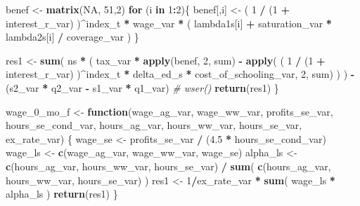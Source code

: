 \documentclass[]{article}
\newenvironment{Shaded}{\begin{snugshade}}{\end{snugshade}}
\newcommand{\CommentTok}[1]{\textcolor[rgb]{0.56,0.35,0.01}{\textit{#1}}}
\newcommand{\ControlFlowTok}[1]{\textcolor[rgb]{0.13,0.29,0.53}{\textbf{#1}}}
\newcommand{\DecValTok}[1]{\textcolor[rgb]{0.00,0.00,0.81}{#1}}
\newcommand{\FloatTok}[1]{\textcolor[rgb]{0.00,0.00,0.81}{#1}}
\newcommand{\KeywordTok}[1]{\textcolor[rgb]{0.13,0.29,0.53}{\textbf{#1}}}
\newcommand{\NormalTok}[1]{#1}
\newcommand{\OperatorTok}[1]{\textcolor[rgb]{0.81,0.36,0.00}{\textbf{#1}}}
\newcommand{\OtherTok}[1]{\textcolor[rgb]{0.56,0.35,0.01}{#1}}
\newcommand{\StringTok}[1]{\textcolor[rgb]{0.31,0.60,0.02}{#1}}
\begin{document}
\begin{Shaded}
\begin{Highlighting}[]
{\NormalTok{  benef <-}\StringTok{ }\KeywordTok{matrix}\NormalTok{(}\OtherTok{NA}\NormalTok{, }\DecValTok{51}\NormalTok{,}\DecValTok{2}\NormalTok{)}
  \ControlFlowTok{for}\NormalTok{ (i }\ControlFlowTok{in} \DecValTok{1}\OperatorTok{:}\DecValTok{2}\NormalTok{)\{}
\NormalTok{  benef[,i] <-}\StringTok{ }\NormalTok{( }\DecValTok{1} \OperatorTok{/}\StringTok{ }\NormalTok{(}\DecValTok{1} \OperatorTok{+}\StringTok{ }\NormalTok{interest_r_var) )}\OperatorTok{^}\NormalTok{index_t }\OperatorTok{*}\StringTok{ }\NormalTok{wage_var }\OperatorTok{*}
\StringTok{                     }\NormalTok{( lambda1s[i] }\OperatorTok{+}\StringTok{ }\NormalTok{saturation_var }\OperatorTok{*}\StringTok{ }\NormalTok{lambda2s[i] }\OperatorTok{/}\StringTok{ }\NormalTok{coverage_var )}
\NormalTok{  \}}

\NormalTok{  res1 <-}\StringTok{ }\KeywordTok{sum}\NormalTok{( ns }\OperatorTok{*}\StringTok{ }\NormalTok{( tax_var }\OperatorTok{*}\StringTok{ }\KeywordTok{apply}\NormalTok{(benef, }\DecValTok{2}\NormalTok{, sum) }\OperatorTok{-}
\StringTok{            }\KeywordTok{apply}\NormalTok{( ( }\DecValTok{1} \OperatorTok{/}\StringTok{ }\NormalTok{(}\DecValTok{1} \OperatorTok{+}\StringTok{ }\NormalTok{interest_r_var) )}\OperatorTok{^}\NormalTok{index_t }\OperatorTok{*}
\StringTok{                     }\NormalTok{delta_ed_s }\OperatorTok{*}\StringTok{ }\NormalTok{cost_of_schooling_var, }\DecValTok{2}\NormalTok{, sum) )}
\NormalTok{          ) }\OperatorTok{-}\StringTok{ }\NormalTok{(s2_var }\OperatorTok{*}\StringTok{ }\NormalTok{q2_var  }\OperatorTok{-}\StringTok{ }\NormalTok{s1_var }\OperatorTok{*}\StringTok{ }\NormalTok{q1_var)}
\CommentTok{#  wser()}
  \KeywordTok{return}\NormalTok{(res1)   }
\NormalTok{\}}

\NormalTok{wage_}\DecValTok{0}\NormalTok{_mo_f <-}\StringTok{ }\ControlFlowTok{function}\NormalTok{(wage_ag_var, wage_ww_var, profits_se_var, hours_se_cond_var, }
\NormalTok{                        hours_ag_var, hours_ww_var, hours_se_var, ex_rate_var) \{}
\NormalTok{  wage_se <-}\StringTok{ }\NormalTok{profits_se_var }\OperatorTok{/}\StringTok{ }\NormalTok{(}\FloatTok{4.5} \OperatorTok{*}\StringTok{ }\NormalTok{hours_se_cond_var)}
\NormalTok{  wage_ls <-}\StringTok{ }\KeywordTok{c}\NormalTok{(wage_ag_var, wage_ww_var, wage_se)}
\NormalTok{  alpha_ls <-}\StringTok{ }\KeywordTok{c}\NormalTok{(hours_ag_var, hours_ww_var, hours_se_var) }\OperatorTok{/}\StringTok{ }\KeywordTok{sum}\NormalTok{( }\KeywordTok{c}\NormalTok{(hours_ag_var, hours_ww_var, hours_se_var) )}
\NormalTok{  res1 <-}\StringTok{ }\DecValTok{1}\OperatorTok{/}\NormalTok{ex_rate_var }\OperatorTok{*}\StringTok{ }\KeywordTok{sum}\NormalTok{( wage_ls }\OperatorTok{*}\StringTok{ }\NormalTok{alpha_ls )}
  \KeywordTok{return}\NormalTok{(res1)}
\NormalTok{\}}

}
\end{Highlighting}
\end{Shaded}
\end{document}

